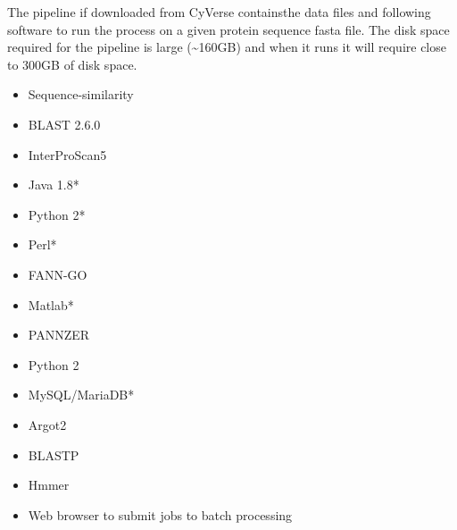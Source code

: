 The pipeline if downloaded from CyVerse containsthe data files and following software to run the process on a given protein sequence fasta file. The disk space required for the pipeline is large (\textasciitilde{}160GB) and when it runs it will require close to 300GB of disk space.

\begin{itemize}
 \item
       Sequence-similarity
 \item
       BLAST 2.6.0
 \item
       InterProScan5
 \item
       Java 1.8*
 \item
       Python 2*
 \item
       Perl*
 \item
       FANN-GO
 \item
       Matlab*
 \item
       PANNZER
 \item
       Python 2
 \item
       MySQL/MariaDB*
 \item
       Argot2
 \item
       BLASTP
 \item
       Hmmer
 \item
       Web browser to submit jobs to batch processing
\end{itemize}